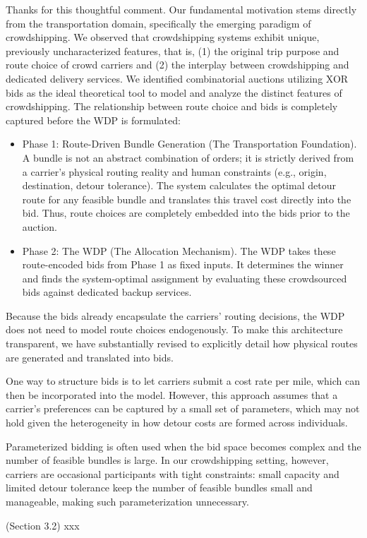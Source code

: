 \begin{revresponse}[1.1.1]
    Thanks for this thoughtful comment. Our fundamental motivation stems directly from the transportation domain, specifically the emerging paradigm of crowdshipping. We observed that crowdshipping systems exhibit unique, previously uncharacterized features, that is, (1) the original trip purpose and route choice of crowd carriers and (2) the interplay between crowdshipping and dedicated delivery services. We identified combinatorial auctions utilizing XOR bids as the ideal theoretical tool to model and analyze the distinct features of crowdshipping. The relationship between route choice and bids is completely captured before the WDP is formulated:
    
    \begin{itemize}
        \item Phase 1: Route-Driven Bundle Generation (The Transportation Foundation). A bundle is not an abstract combination of orders; it is strictly derived from a carrier’s physical routing reality and human constraints (e.g., origin, destination, detour tolerance). The system calculates the optimal detour route for any feasible bundle and translates this travel cost directly into the bid. Thus, route choices are completely embedded into the bids prior to the auction.
        \item Phase 2: The WDP (The Allocation Mechanism). The WDP takes these route-encoded bids from Phase 1 as fixed inputs. It determines the winner and finds the system-optimal assignment by evaluating these crowdsourced bids against dedicated backup services.
    \end{itemize}

    Because the bids already encapsulate the carriers' routing decisions, the WDP does not need to model route choices endogenously. To make this architecture transparent, we have substantially revised  to explicitly detail how physical routes are generated and translated into bids. 
    
    One way to structure bids is to let carriers submit a cost rate per mile, which can then be incorporated into the model. However, this approach assumes that a carrier's preferences can be captured by a small set of parameters, which may not hold given the heterogeneity in how detour costs are formed across individuals.
    
    Parameterized bidding is often used when the bid space becomes complex and the number of feasible bundles is large. In our crowdshipping setting, however, carriers are occasional participants with tight constraints: small capacity and limited detour tolerance keep the number of feasible bundles small and manageable, making such parameterization unnecessary. 
    
    \begin{changes}
        (Section 3.2) xxx
    \end{changes}
\end{revresponse}


